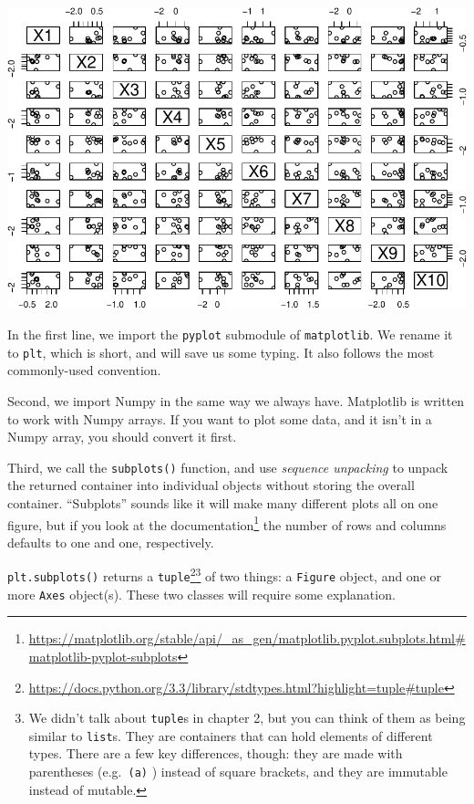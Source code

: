 \documentclass[
  12pt,
  krantz2]{krantz}
\renewcommand{\href}[2]{#2\footnote{\url{#1}}}
\begin{document}
\includegraphics[width=0.8\linewidth]{r_and_python_book_files/figure-latex/unnamed-chunk-207-1}

In the first line, we import the \texttt{pyplot} submodule of \texttt{matplotlib}. We rename it to \texttt{plt}, which is short, and will save us some typing. It also follows the most commonly-used convention.

Second, we import Numpy in the same way we always have. Matplotlib is written to work with Numpy arrays. If you want to plot some data, and it isn't in a Numpy array, you should convert it first.

Third, we call the \texttt{subplots()} function, and use \emph{sequence unpacking} to unpack the returned container into individual objects without storing the overall container. ``Subplots'' sounds like it will make many different plots all on one figure, but if you look at the \href{https://matplotlib.org/stable/api/_as_gen/matplotlib.pyplot.subplots.html\#matplotlib-pyplot-subplots}{documentation} the number of rows and columns defaults to one and one, respectively.

\texttt{plt.subplots()} returns a \href{https://docs.python.org/3.3/library/stdtypes.html?highlight=tuple\#tuple}{\texttt{tuple}}\footnote{We didn't talk about \texttt{tuple}s in chapter 2, but you can think of them as being similar to \texttt{list}s. They are containers that can hold elements of different types. There are a few key differences, though: they are made with parentheses (e.g.~\texttt{(\textquotesingle{}a\textquotesingle{})} ) instead of square brackets, and they are immutable instead of mutable.} of two things: a \texttt{Figure} object, and one or more \texttt{Axes} object(s). These two classes will require some explanation.
\end{document}
